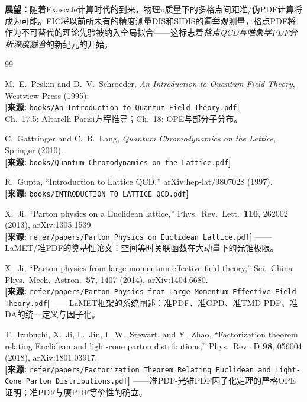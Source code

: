 \documentclass[12pt,a4paper]{ctexart}
\theoremstyle{definition}
\begin{document}
\textbf{展望：}随着Exascale计算时代的到来，物理$\pi$质量下的多格点间距准/伪PDF计算将成为可能。EIC将以前所未有的精度测量DIS和SIDIS的遍举观测量，格点PDF将作为不可替代的理论先验被纳入全局拟合——这标志着\emph{格点QCD与唯象学PDF分析深度融合}的新纪元的开始。

\begin{thebibliography}{99}

M.~E.~Peskin and D.~V.~Schroeder,
\textit{An Introduction to Quantum Field Theory}, Westview Press (1995).
\\\textbf{[来源:} \texttt{books/An Introduction to Quantum Field Theory.pdf}\textbf{]}
\\Ch.~17.5: Altarelli-Parisi方程推导；Ch.~18: OPE与部分子分布。

C.~Gattringer and C.~B.~Lang,
\textit{Quantum Chromodynamics on the Lattice}, Springer (2010).
\\\textbf{[来源:} \texttt{books/Quantum Chromodynamics on the Lattice.pdf}\textbf{]}

R.~Gupta, ``Introduction to Lattice QCD,'' arXiv:hep-lat/9807028 (1997).
\\\textbf{[来源:} \texttt{books/INTRODUCTION TO LATTICE QCD.pdf}\textbf{]}

X.~Ji, ``Parton physics on a Euclidean lattice,''
Phys.\ Rev.\ Lett.\ \textbf{110}, 262002 (2013), arXiv:1305.1539.
\\\textbf{[来源:} \texttt{refer/papers/Parton Physics on Euclidean Lattice.pdf}\textbf{]}
——LaMET/准PDF的奠基性论文：空间等时关联函数在大动量下的光锥极限。

X.~Ji, ``Parton physics from large-momentum effective field theory,''
Sci.\ China Phys.\ Mech.\ Astron.\ \textbf{57}, 1407 (2014), arXiv:1404.6680.
\\\textbf{[来源:} \texttt{refer/papers/Parton Physics from Large-Momentum Effective Field Theory.pdf}\textbf{]}
——LaMET框架的系统阐述：准PDF、准GPD、准TMD-PDF、准DA的统一定义与因子化。

T.~Izubuchi, X.~Ji, L.~Jin, I.~W.~Stewart, and Y.~Zhao,
``Factorization theorem relating Euclidean and light-cone parton distributions,''
Phys.\ Rev.\ D \textbf{98}, 056004 (2018), arXiv:1801.03917.
\\\textbf{[来源:} \texttt{refer/papers/Factorization Theorem Relating Euclidean and Light-Cone Parton Distributions.pdf}\textbf{]}
——准PDF-光锥PDF因子化定理的严格OPE证明；准PDF与赝PDF等价性的确立。


\end{thebibliography}
\end{document}

